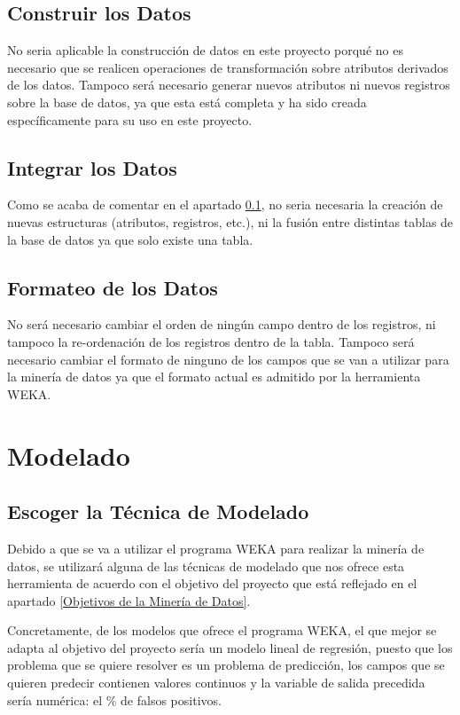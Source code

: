 \documentclass{article}
\begin{document}
\subsection{Construir los Datos}\label{Construir los Datos}
No seria aplicable la construcción de datos en este proyecto porqué no es necesario que se realicen operaciones de transformación sobre atributos derivados de los datos. Tampoco será necesario generar nuevos atributos ni nuevos registros sobre la base de datos, ya que esta está completa y ha sido creada específicamente para su uso en este proyecto.

\subsection{Integrar los Datos}
Como se acaba de comentar en el apartado \ref{Construir los Datos}, no seria necesaria la creación de nuevas estructuras (atributos, registros, etc.), ni la fusión entre distintas tablas de la base de datos ya que solo existe una tabla.

\subsection{Formateo de los Datos}
No será necesario cambiar el orden de ningún campo dentro de los registros, ni tampoco la re-ordenación de los registros dentro de la tabla. Tampoco será necesario cambiar el formato de ninguno de los campos que se van a utilizar para la minería de datos ya que el formato actual es admitido por la herramienta WEKA.

\section{Modelado}

\subsection{Escoger la Técnica de Modelado}
Debido a que se va a utilizar el programa WEKA para realizar la minería de datos, se utilizará alguna de las técnicas de modelado que nos ofrece esta herramienta de acuerdo con el objetivo del proyecto que está reflejado en el apartado \ref{Objetivos de la Minería de Datos}.

Concretamente, de los modelos que ofrece el programa WEKA, el que mejor se adapta al objetivo del proyecto sería un modelo lineal de regresión, puesto que los problema que se quiere resolver es un problema de predicción, los campos que se quieren predecir contienen valores continuos y la variable de salida precedida sería numérica: el \% de falsos positivos.
\end{document}
